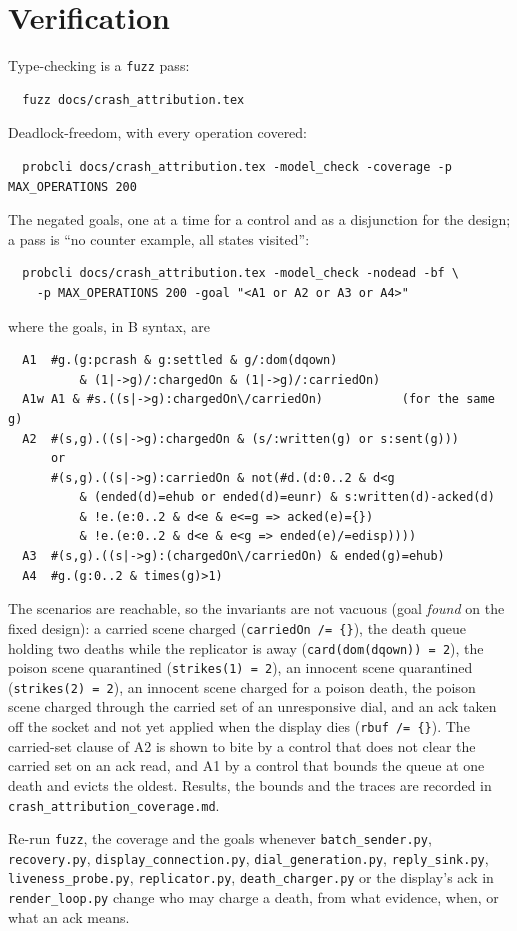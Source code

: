 \documentclass[a4paper,10pt,fleqn]{article}
\begin{document}
\section{Verification}
\label{sec:verify}

Type-checking is a \texttt{fuzz} pass:
\begin{verbatim}
  fuzz docs/crash_attribution.tex
\end{verbatim}

Deadlock-freedom, with every operation covered:
\begin{verbatim}
  probcli docs/crash_attribution.tex -model_check -coverage -p MAX_OPERATIONS 200
\end{verbatim}
The negated goals, one at a time for a control and as a disjunction for the
design; a pass is ``no counter example, all states visited'':
\begin{verbatim}
  probcli docs/crash_attribution.tex -model_check -nodead -bf \
    -p MAX_OPERATIONS 200 -goal "<A1 or A2 or A3 or A4>"
\end{verbatim}
where the goals, in B syntax, are
\begin{verbatim}
  A1  #g.(g:pcrash & g:settled & g/:dom(dqown)
          & (1|->g)/:chargedOn & (1|->g)/:carriedOn)
  A1w A1 & #s.((s|->g):chargedOn\/carriedOn)           (for the same g)
  A2  #(s,g).((s|->g):chargedOn & (s/:written(g) or s:sent(g)))
      or
      #(s,g).((s|->g):carriedOn & not(#d.(d:0..2 & d<g
          & (ended(d)=ehub or ended(d)=eunr) & s:written(d)-acked(d)
          & !e.(e:0..2 & d<e & e<=g => acked(e)={})
          & !e.(e:0..2 & d<e & e<g => ended(e)/=edisp))))
  A3  #(s,g).((s|->g):(chargedOn\/carriedOn) & ended(g)=ehub)
  A4  #g.(g:0..2 & times(g)>1)
\end{verbatim}
The scenarios are reachable, so the invariants are not vacuous (goal
\emph{found} on the fixed design): a carried scene charged
(\texttt{carriedOn /= \{\}}), the death queue holding two deaths while the
replicator is away (\texttt{card(dom(dqown)) = 2}), the poison scene quarantined
(\texttt{strikes(1) = 2}), an innocent scene quarantined (\texttt{strikes(2) =
2}), an innocent scene charged for a poison death, the poison scene charged through the carried set of an unresponsive dial, and an ack taken off the socket and not yet applied when the display dies (\texttt{rbuf /= \{\}}).  The carried-set clause of A2
is shown to bite by a control that does not clear the carried set on an ack
read, and A1 by a control that bounds the queue at one death and evicts the
oldest.  Results, the bounds and the traces are recorded in
\texttt{crash\_attribution\_coverage.md}.

Re-run \texttt{fuzz}, the coverage and the goals whenever
\texttt{batch\_sender.py}, \texttt{recovery.py}, \texttt{display\_connection.py},
\texttt{dial\_generation.py}, \texttt{reply\_sink.py},
\texttt{liveness\_probe.py}, \texttt{replicator.py}, \texttt{death\_charger.py} or
the display's ack in \texttt{render\_loop.py} change who may charge a death, from
what evidence, when, or what an ack means.
\end{document}
